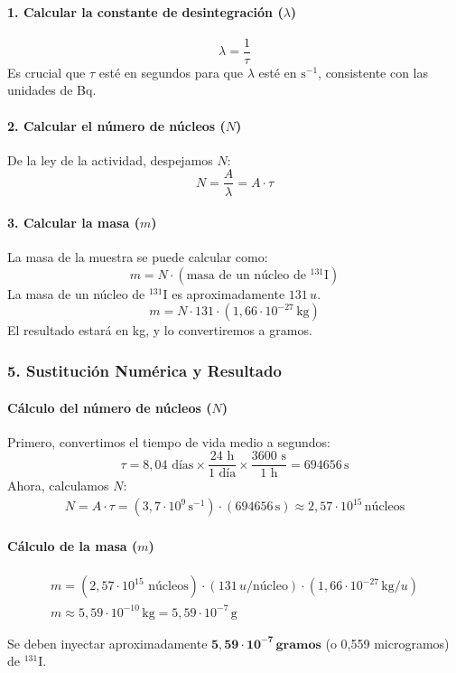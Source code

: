 \paragraph*{1. Calcular la constante de desintegración ($\lambda$)}
$$\lambda = \frac{1}{\tau}$$
Es crucial que $\tau$ esté en segundos para que $\lambda$ esté en $\text{s}^{-1}$, consistente con las unidades de Bq.

\paragraph*{2. Calcular el número de núcleos ($N$)}
De la ley de la actividad, despejamos $N$:
$$N = \frac{A}{\lambda} = A \cdot \tau$$

\paragraph*{3. Calcular la masa ($m$)}
La masa de la muestra se puede calcular como:
$$m = N \cdot (\text{masa de un núcleo de }{}^{131}\text{I})$$
La masa de un núcleo de ${}^{131}\text{I}$ es aproximadamente $131 \, u$.
$$m = N \cdot 131 \cdot (1,66 \cdot 10^{-27} \, \text{kg})$$
El resultado estará en kg, y lo convertiremos a gramos.

\subsubsection*{5. Sustitución Numérica y Resultado}
\paragraph*{Cálculo del número de núcleos ($N$)}
Primero, convertimos el tiempo de vida medio a segundos:
$$\tau = 8,04 \text{ días} \times \frac{24 \text{ h}}{1 \text{ día}} \times \frac{3600 \text{ s}}{1 \text{ h}} = 694656 \, \text{s}$$
Ahora, calculamos $N$:
\begin{gather}
    N = A \cdot \tau = (3,7 \cdot 10^9 \, \text{s}^{-1}) \cdot (694656 \, \text{s}) \approx 2,57 \cdot 10^{15} \, \text{núcleos}
\end{gather}

\paragraph*{Cálculo de la masa ($m$)}
\begin{gather}
    m = (2,57 \cdot 10^{15} \text{ núcleos}) \cdot (131 \, u/\text{núcleo}) \cdot (1,66 \cdot 10^{-27} \, \text{kg}/u) \\
    m \approx 5,59 \cdot 10^{-10} \, \text{kg} = 5,59 \cdot 10^{-7} \, \text{g}
\end{gather}
\begin{cajaresultado}
    Se deben inyectar aproximadamente $\boldsymbol{5,59 \cdot 10^{-7} \, \textbf{gramos}}$ (o 0,559 microgramos) de ${}^{131}\text{I}$.
\end{cajaresultado}


